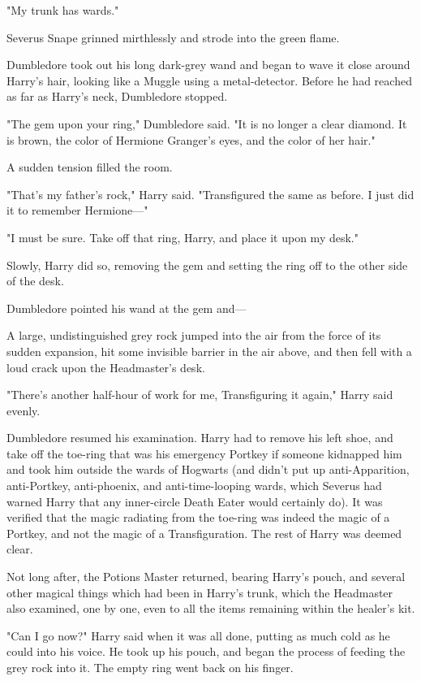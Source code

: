 "My trunk has wards."

Severus Snape grinned mirthlessly and strode into the green flame.

Dumbledore took out his long dark-grey wand and began to wave it close around
Harry's hair, looking like a Muggle using a metal-detector. Before he had
reached as far as Harry's neck, Dumbledore stopped.

"The gem upon your ring," Dumbledore said. "It is no longer a clear diamond. It
is brown, the color of Hermione Granger's eyes, and the color of her hair."

A sudden tension filled the room.

"That's my father's rock," Harry said. "Transfigured the same as before. I just
did it to remember Hermione\mbox{---}"

"I must be sure. Take off that ring, Harry, and place it upon my desk."

Slowly, Harry did so, removing the gem and setting the ring off to the other
side of the desk.

Dumbledore pointed his wand at the gem and---

A large, undistinguished grey rock jumped into the air from the force of its
sudden expansion, hit some invisible barrier in the air above, and then fell
with a loud crack upon the Headmaster's desk.

"There's another half-hour of work for me, Transfiguring it again," Harry said
evenly.

Dumbledore resumed his examination. Harry had to remove his left shoe, and take
off the toe-ring that was his emergency Portkey if someone kidnapped him and
took him outside the wards of Hogwarts (and didn't put up anti-Apparition,
anti-Portkey, anti-phoenix, and anti-time-looping wards, which Severus had
warned Harry that any inner-circle Death Eater would certainly do). It was
verified that the magic radiating from the toe-ring was indeed the magic of a
Portkey, and not the magic of a Transfiguration. The rest of Harry was deemed
clear.

Not long after, the Potions Master returned, bearing Harry's pouch, and several
other magical things which had been in Harry's trunk, which the Headmaster also
examined, one by one, even to all the items remaining within the healer's kit.

"Can I go now?" Harry said when it was all done, putting as much cold as he
could into his voice. He took up his pouch, and began the process of feeding
the grey rock into it. The empty ring went back on his finger.


